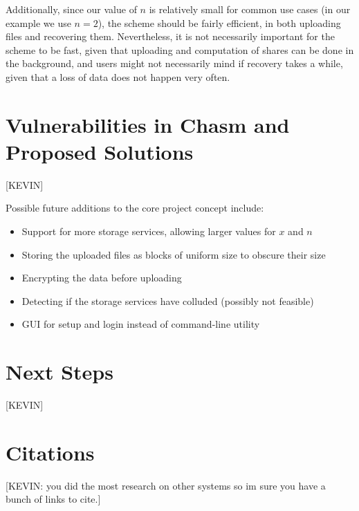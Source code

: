 \documentclass[letterpaper,twocolumn,10pt]{article}
\begin{document}
Additionally, since our value of $n$ is relatively small for common use cases (in our example we use $n=2$), the scheme should be fairly efficient, in both uploading files and recovering them. Nevertheless, it is not necessarily important for the scheme to be fast, given that uploading and computation of shares can be done in the background, and users might not necessarily mind if recovery takes a while, given that a loss of data does not happen very often.


\section{Vulnerabilities in Chasm and Proposed Solutions}
[KEVIN]

Possible future additions to the core project concept include:

\begin{itemize}
	\item Support for more storage services, allowing larger values for $x$ and $n$
    \item Storing the uploaded files as blocks of uniform size to obscure their size
    \item Encrypting the data before uploading
    \item Detecting if the storage services have colluded (possibly not feasible)
    \item GUI for setup and login instead of command-line utility
\end{itemize}
\section{ Next Steps}
[KEVIN]
\section{Citations}
[KEVIN: you did the most research on other systems so im sure you have a bunch of links to cite.]
\end{document}
